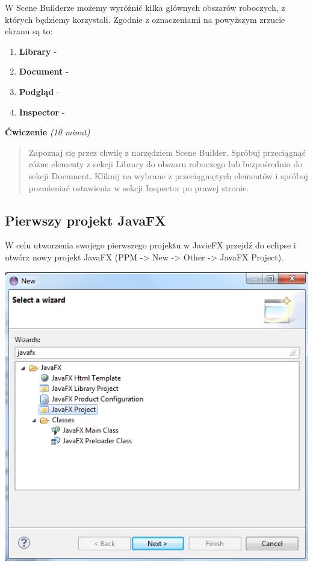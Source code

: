 \documentclass[letterpaper,10pt,english]{sphinxmanual}
\begin{document}
W Scene Builderze możemy wyróżnić kilka głównych obszarów roboczych, z których będziemy korzystali. Zgodnie z oznaczeniami na powyższym zrzucie ekranu są to:
\begin{enumerate}
\item {} 
\textbf{Library} -

\item {} 
\textbf{Document} -

\item {} 
\textbf{Podgląd} -

\item {} 
\textbf{Inspector} -

\end{enumerate}

\textbf{Ćwiczenie} \emph{(10 minut)}
\begin{quote}

Zapoznaj się przez chwilę z narzędziem Scene Builder. Spróbuj przeciągnąć różne elementy z sekcji Library do obszaru roboczego lub bezpośrednio do sekcji Document. Kliknij na wybrane z przeciągniętych elementów i spróbuj pozmieniać ustawienia w sekcji Inspector po prawej stronie.
\end{quote}


\subsection{Pierwszy projekt JavaFX}
\label{gui:pierwszy-projekt-javafx}
W celu utworzenia swojego pierwszego projektu w JavieFX przejdź do eclipse i utwórz nowy projekt JavaFX (PPM -\textgreater{} New -\textgreater{} Other -\textgreater{} JavaFX Project).

{\hfill\includegraphics{fx1.png}\hfill}
\end{document}
